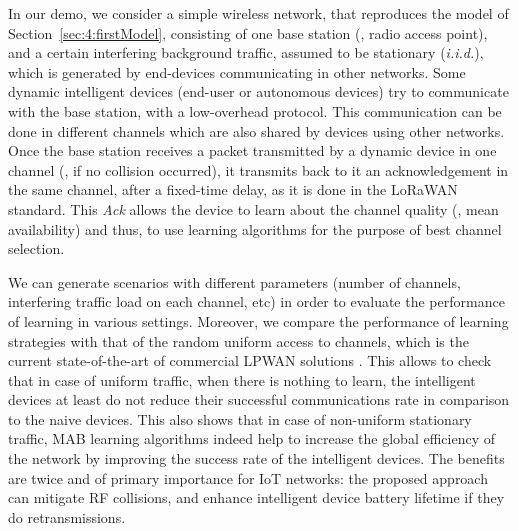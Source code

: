 In our demo, we consider a simple wireless network, that reproduces the model of Section~\ref{sec:4:firstModel}, consisting of one base station (\ie, radio access point), and a certain interfering background traffic, assumed to be stationary (\emph{i.i.d.}), which is generated by end-devices communicating in other networks.
Some dynamic intelligent devices (end-user or autonomous devices) try to communicate with the base station, with a low-overhead protocol. This communication can be done in different channels which are also shared by devices using other networks.
Once the base station receives a packet transmitted by a dynamic device in one channel (\ie, if no collision occurred), it transmits back to it an acknowledgement in the same channel, after a fixed-time delay, as it is done in the LoRaWAN standard.
This \emph{Ack} allows the device to learn about the channel quality (\ie, mean availability) and thus, to use learning algorithms for the purpose of best channel selection.

We can generate scenarios with different parameters (number of channels, interfering traffic load on each channel, etc) in order to evaluate the performance of learning in various settings.
Moreover, we compare the performance of learning strategies with that of the random uniform access to channels, which is the current state-of-the-art of commercial LPWAN solutions \cite{Raza17}.
%
This allows to check that in case of uniform traffic, when there is nothing to learn, the intelligent devices at least do not reduce their successful communications rate in comparison to the naive devices.
This also shows that in case of non-uniform stationary traffic, MAB learning algorithms indeed help to increase the global efficiency of the network by improving the success rate of the intelligent devices.
%
The benefits are twice and of primary importance for IoT networks:
the proposed approach can mitigate RF collisions,
and enhance intelligent device battery lifetime if they do retransmissions.




